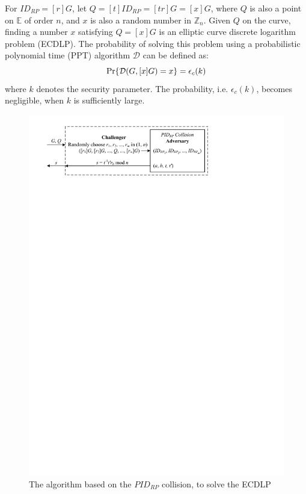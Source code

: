 For $ID_{RP}=[r]G$, let $Q=[t]ID_{RP}=[tr]G=[x]G$, where $Q$ is also a point on $\mathbb{E}$ of order $n$, and $x$ is also a random number in $\mathbb{Z}_n$. Given $Q$ on the curve, finding a number $x$ satisfying $Q = [x]G$ is an elliptic curve discrete logarithm problem (ECDLP). The probability of solving this problem using a probabilistic polynomial time (PPT) algorithm $\mathcal{D}$ can be defined as:
\begin{equation*}
{\rm Pr}\{\mathcal{D}(G, [x]G)=x\} = \epsilon_{c}(k)
\end{equation*}
where $k$ denotes the security parameter. The probability, i.e. $\epsilon_{c}(k)$, becomes negligible, when $k$ is sufficiently large.

\begin{figure}[tb]
  \centering
  \includegraphics[width=0.97\linewidth]{fig/ecdlp_algorithm.pdf}
  \caption{The algorithm based on the $PID_{RP}$ collision, to solve the ECDLP}
  \label{fig:ecdlp_algorithm}
\end{figure}

